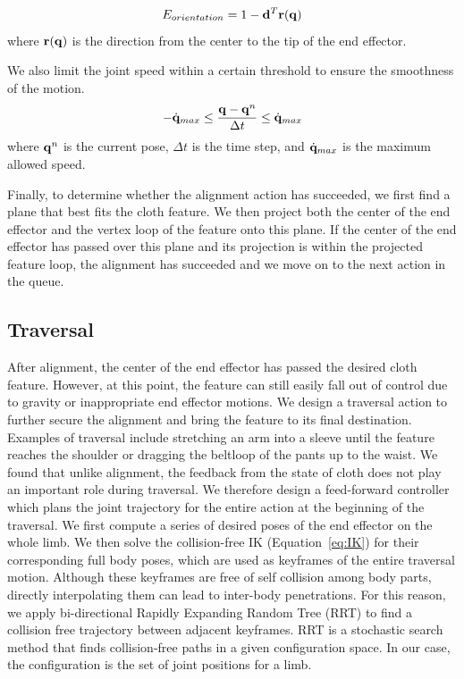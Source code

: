 \begin{equation}
  E_{orientation} = 1-\mathbf{d}^T\mathbf{r(q})
  \label{eq:orientation}
\end{equation}
where $\mathbf{r(q)}$ is the direction from the center to the tip of the end effector.

We also limit the joint speed within a certain threshold to ensure the smoothness of the motion.
\begin{equation}
  -\dot{\mathbf{q}}_{max} \leq \frac{\mathbf{q} - \mathbf{q}^n}{\Delta t} \leq \dot{\mathbf{q}}_{max}
  \label{eq:speed}
\end{equation}
where $\mathbf{q}^n$ is the current pose, $\Delta t$ is the time step, and $\dot{\mathbf{q}}_{max}$ is the maximum allowed speed.

Finally, to determine whether the alignment action has succeeded, we first find a plane that best fits the cloth feature. We then project both the center of the end effector and the vertex loop of the feature onto this plane. If the center of the end effector has passed over  this plane and its projection is within the projected feature loop, the alignment has succeeded and we move on to the next action in the queue.

\subsection{Traversal}
After alignment, the center of the end effector has passed the desired cloth feature. However, at this point, the feature can still easily fall out of control due to gravity or inappropriate end effector motions. We design a traversal action to further secure the alignment and bring the feature to its final destination. Examples of traversal include stretching an arm into a sleeve until the feature reaches the shoulder or dragging the beltloop of the pants up to the waist. We found that unlike alignment, the feedback from the state of cloth does not play an important role during traversal. We therefore design a feed-forward controller which plans the joint trajectory for the entire action at the beginning of the traversal. We first compute a series of desired poses of the end effector on the whole limb. We then solve the collision-free IK (Equation~\ref{eq:IK}) for their corresponding full body poses, which are used as keyframes of the entire traversal motion. Although these keyframes are free of self collision among body parts, directly interpolating them can lead to inter-body penetrations. For this reason, we apply bi-directional Rapidly Expanding Random Tree (RRT) \cite{LaValleK:2001} to find a collision free trajectory between adjacent keyframes. RRT is a stochastic search method that finds collision-free paths in a given configuration space. In our case, the configuration is the set of joint positions for a limb.

